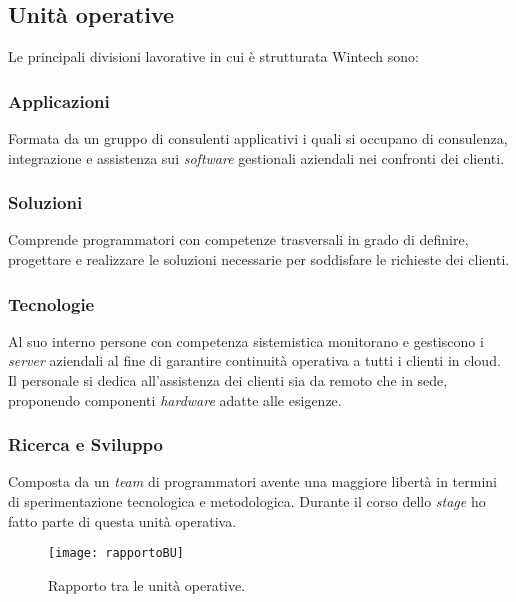 \subsection{Unità operative}

\noindent Le principali divisioni lavorative in cui è strutturata Wintech sono:

\subsubsection*{Applicazioni}
Formata da un gruppo di consulenti applicativi i quali si occupano di consulenza, integrazione e assistenza sui \emph{software} gestionali aziendali nei confronti dei clienti. 

\subsubsection*{Soluzioni}
Comprende programmatori con competenze trasversali in grado di definire, progettare e realizzare le soluzioni necessarie per soddisfare le richieste dei clienti. 

\subsubsection*{Tecnologie}
Al suo interno persone con competenza sistemistica monitorano e gestiscono i \emph{server} aziendali al fine di garantire continuità operativa a tutti i clienti in \gls{cloud}. Il personale si dedica all'assistenza dei clienti sia da remoto che in sede, proponendo componenti \emph{hardware} adatte alle esigenze. 

\subsubsection*{Ricerca e Sviluppo}
Composta da un \emph{team} di programmatori avente una maggiore libertà in termini di sperimentazione tecnologica e metodologica. Durante il corso dello \emph{stage} ho fatto parte di questa \gls{unità operativa}.\\
\begin{figure}[htbp] 
    \centering 
    \texttt{[image: rapportoBU]}
    \caption{Rapporto tra le unità operative.} 
    \label{fig:rapportoBU}
\end{figure}
